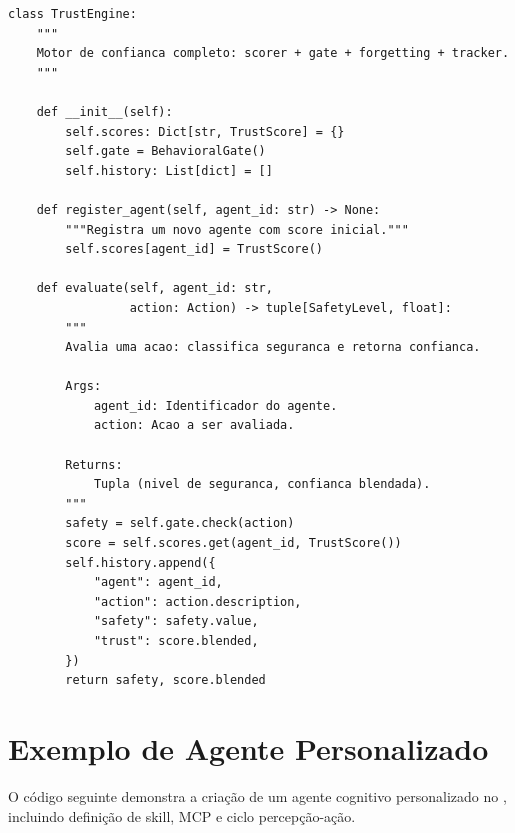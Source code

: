 \begin{lstlisting}[caption={Configuracao do Trust Engine},
                   label={cod:trust}, style=pythonstyle]
class TrustEngine:
    """
    Motor de confianca completo: scorer + gate + forgetting + tracker.
    """

    def __init__(self):
        self.scores: Dict[str, TrustScore] = {}
        self.gate = BehavioralGate()
        self.history: List[dict] = []

    def register_agent(self, agent_id: str) -> None:
        """Registra um novo agente com score inicial."""
        self.scores[agent_id] = TrustScore()

    def evaluate(self, agent_id: str,
                 action: Action) -> tuple[SafetyLevel, float]:
        """
        Avalia uma acao: classifica seguranca e retorna confianca.

        Args:
            agent_id: Identificador do agente.
            action: Acao a ser avaliada.

        Returns:
            Tupla (nivel de seguranca, confianca blendada).
        """
        safety = self.gate.check(action)
        score = self.scores.get(agent_id, TrustScore())
        self.history.append({
            "agent": agent_id,
            "action": action.description,
            "safety": safety.value,
            "trust": score.blended,
        })
        return safety, score.blended
\end{lstlisting}

\section{Exemplo de Agente Personalizado}
\label{sec:cod-agente}

O código seguinte demonstra a criação de um agente cognitivo personalizado
no \opencodeeco{}, incluindo definição de skill, MCP e ciclo percepção-ação.

